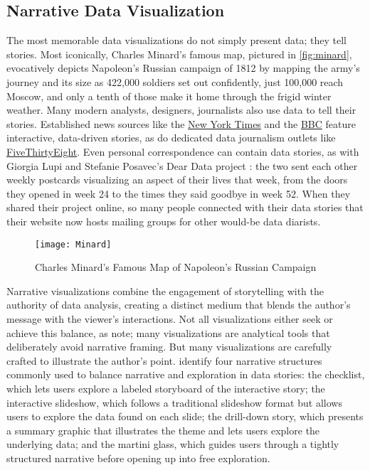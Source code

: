 \subsection{Narrative Data Visualization}\label{sec:lit-vis}
The most memorable data visualizations do not simply present data; they tell stories. Most iconically, Charles Minard's famous map, pictured in \autoref{fig:minard}, evocatively depicts Napoleon's Russian campaign of 1812 by mapping the army's journey and its size as 422,000 soldiers set out confidently, just 100,000 reach Moscow, and only a tenth of those make it home through the frigid winter weather. Many modern analysts, designers, journalists also use data to tell their stories. Established news sources like the \href{http://www.nytimes.com/interactive/2015/us/year-in-interactive-storytelling.html}{New York Times} and the \href{http://www.bbc.com/news/11628973}{BBC} feature interactive, data-driven stories, as do dedicated data journalism outlets like \href{http://fivethirtyeight.com/}{FiveThirtyEight}. Even personal correspondence can contain data stories, as with Giorgia Lupi and Stefanie Posavec's Dear Data project \citep{DearData}: the two sent each other weekly postcards visualizing an aspect of their lives that week, from the doors they opened in week 24 to the times they said goodbye in week 52. When they shared their project online, so many people connected with their data stories that their website now hosts mailing groups for other would-be data diarists.

\begin{figure}
  \texttt{[image: Minard]}
  \caption{Charles Minard's Famous Map of Napoleon's Russian Campaign}
  \label{fig:minard}
\end{figure}

Narrative visualizations combine the engagement of storytelling with the authority of data analysis, creating a distinct medium that blends the author's message with the viewer's interactions. Not all visualizations either seek or achieve this balance, as \citet{LeeEtAl2015More} note; many visualizations are analytical tools that deliberately avoid narrative framing. But many visualizations are carefully crafted to illustrate the author's point. \citet{SegelHeer2010Narrative} identify four narrative structures commonly used to balance narrative and exploration in data stories: the checklist, which lets users explore a labeled storyboard of the interactive story; the interactive slideshow, which follows a traditional slideshow format but allows users to explore the data found on each slide; the drill-down story, which presents a summary graphic that illustrates the theme and lets users explore the underlying data; and the martini glass, which guides users through a tightly structured narrative before opening up into free exploration.

